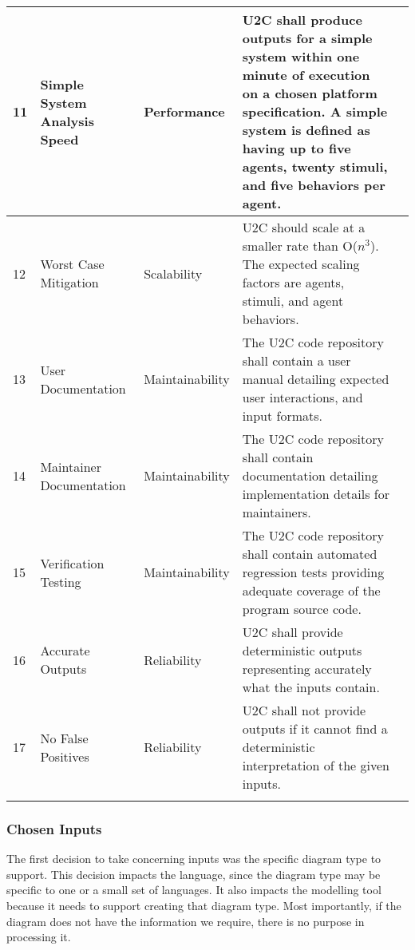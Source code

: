 \documentclass[11pt]{article}
\begin{document}
\begin{longtable}{|l|p{2.6cm}|l|p{4.5cm}|c|}
        \hline
        11 & Simple System Analysis Speed & Performance & U2C shall produce outputs for a simple system within one minute of execution on a chosen platform specification.
        A simple system is defined as having up to five agents, twenty stimuli, and five behaviors per agent. & \cellcolor{gray!30}  \\
        \hline
        12 & Worst Case Mitigation & Scalability & U2C should scale at a smaller rate than O($n^3$). The expected scaling factors are agents, stimuli, and agent behaviors. & \cellcolor{gray!30}  \\
        \hline
        13 & User Documentation & Maintainability & The U2C code repository shall contain a user manual detailing expected user interactions, and input formats. & \cellcolor{gray!30}  \\
        \hline
        14 & Maintainer Documentation & Maintainability & The U2C code repository shall contain documentation detailing implementation details for maintainers. & \cellcolor{green!30}  \\
        \hline
        15 & Verification Testing & Maintainability & The U2C code repository shall contain automated regression tests providing adequate coverage of the program source code. & \cellcolor{green!30}  \\
        \hline
        16 & Accurate Outputs & Reliability & U2C shall provide deterministic outputs representing accurately what the inputs contain. & \cellcolor{green!30}  \\
        \hline
        17 & No False Positives & Reliability & U2C shall not provide outputs if it cannot find a deterministic interpretation of the given inputs. & \cellcolor{green!30}  \\
        \hline
        \label{tab:user-reqs}
    \end{longtable}

    \subsubsection{Chosen Inputs}
    The first decision to take concerning inputs was the specific diagram type to support.
    This decision impacts the language, since the diagram type may be specific to one or a small set of languages.
    It also impacts the modelling tool because it needs to support creating that diagram type.
    Most importantly, if the diagram does not have the information we require, there is no purpose in processing it.
    
\end{document}
